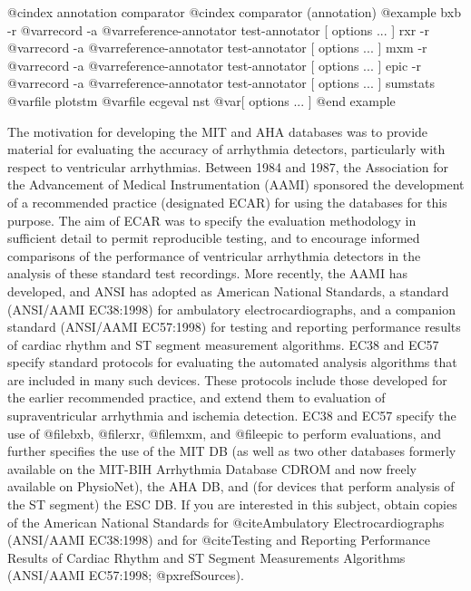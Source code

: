 {{{{{{{{@cindex annotation comparator
@cindex comparator (annotation)
@example
bxb -r @var{record} -a @var{reference-annotator test-annotator [ options ... ]}
rxr -r @var{record} -a @var{reference-annotator test-annotator [ options ... ]}
mxm -r @var{record} -a @var{reference-annotator test-annotator [ options ... ]}
epic -r @var{record} -a @var{reference-annotator test-annotator [ options ... ]}
sumstats @var{file}
plotstm @var{file}
ecgeval
nst @var{[ options ... ]}
@end example

The motivation for developing the MIT and AHA databases was to provide
material for evaluating the accuracy of arrhythmia detectors,
particularly with respect to ventricular arrhythmias.  Between 1984
and 1987, the Association for the Advancement of Medical
Instrumentation (AAMI) sponsored the development of a recommended
practice (designated ECAR) for using the databases for this purpose.
The aim of ECAR was to specify the evaluation methodology in
sufficient detail to permit reproducible testing, and to encourage
informed comparisons of the performance of ventricular arrhythmia
detectors in the analysis of these standard test recordings.  More
recently, the AAMI has developed, and ANSI has adopted as American
National Standards, a standard (ANSI/AAMI EC38:1998) for ambulatory
electrocardiographs, and a companion standard (ANSI/AAMI EC57:1998)
for testing and reporting performance results of cardiac rhythm and ST
segment measurement algorithms.  EC38 and EC57 specify standard
protocols for evaluating the automated analysis algorithms that are
included in many such devices.  These protocols include those
developed for the earlier recommended practice, and extend them to
evaluation of supraventricular arrhythmia and ischemia detection.
EC38 and EC57 specify the use of @file{bxb}, @file{rxr}, @file{mxm},
and @file{epic} to perform evaluations, and further specifies the use
of the MIT DB (as well as two other databases formerly available on
the MIT-BIH Arrhythmia Database CDROM and now freely available on
PhysioNet), the AHA DB, and (for devices that perform analysis of the
ST segment) the ESC DB.  If you are interested in this subject, obtain
copies of the American National Standards for @cite{Ambulatory
Electrocardiographs} (ANSI/AAMI EC38:1998) and for @cite{Testing and
Reporting Performance Results of Cardiac Rhythm and ST Segment
Measurements Algorithms} (ANSI/AAMI EC57:1998; @pxref{Sources}).

}}}}}}}}
